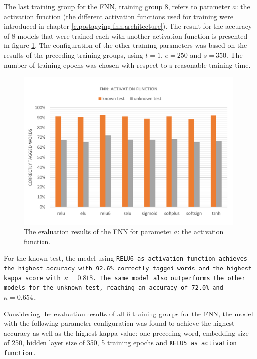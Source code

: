 The last training group for the FNN, \b{training group 8}, refers to parameter $a$: the activation function (the different activation functions used for training were introduced in chapter \ref{c.postagging.fnn.architecture}). The result for the accuracy of 8 models that were trained each with another activation function is presented in figure \ref{f.evaluation.fnn.a}. The configuration of the other training parameters was based on the results of the preceding training groups, using $t=1$, $e=250$ and $s=350$. The number of training epochs was chosen with respect to a reasonable training time.

\begin{figure}[H]
	\hspace{-5mm}\includegraphics[width=1.07\textwidth]{images/evaluation_fnn_a}
	\caption[FNN Evaluation: Activation Function]{The evaluation results of the FNN for parameter $a$: the activation function.}
	\label{f.evaluation.fnn.a}
\end{figure}

For the known test, the model using \tt{RELU6} as activation function achieves the highest accuracy with 92.6\% correctly tagged words and the highest kappa score with $\kappa=0.818$. The same model also outperforms the other models for the unknown test, reaching an accuracy of 72.0\% and $\kappa=0.654$.

Considering the evaluation results of all 8 training groups for the FNN, the model with the following parameter configuration was found to achieve the highest accuracy as well as the highest kappa value: one preceding word, embedding size of 250, hidden layer size of 350, 5 training epochs and \tt{RELU5} as activation function.

